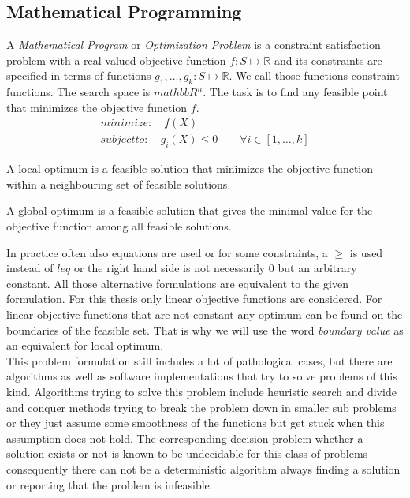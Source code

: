 \subsection{Mathematical Programming}
A \emph{Mathematical Program} or \emph{Optimization Problem} is a constraint satisfaction problem with a real valued objective function $f:S\mapsto \mathbb{R}$ and its constraints are specified in terms of functions $g_1,\dots,g_k:S\mapsto\mathbb{R}$. We call those functions constraint functions. The search space is $mathbb{R}^n$. The task is to find any feasible point that minimizes the objective function $f$.
\begin{eqnarray}
minimize: \quad f(X)\\
subject to: \quad g_i(X)\leq 0 \qquad \forall i\in\left[1,\dots ,k\right] 
\end{eqnarray}
\begin{definition}
A local optimum is a feasible solution that minimizes the objective function within a neighbouring set of feasible solutions.
\end{definition}
\begin{definition}
A global optimum is a feasible solution that gives the minimal value for the objective function among all feasible solutions.
\end{definition}
In practice often also equations are used or for some constraints, a $\geq$ is used instead of $leq$ or the right hand side is not necessarily $0$ but an arbitrary constant. All those alternative formulations are equivalent to the given formulation.
For this thesis only linear objective functions are considered. For linear objective functions that are not constant any optimum can be found on the boundaries of the feasible set. That is why we will use the word \emph{boundary value} as an equivalent for local optimum.\\
This problem formulation still includes a lot of pathological cases, but there are algorithms as well as software implementations that try to solve problems of this kind. Algorithms trying to solve this problem include heuristic search and divide and conquer methods trying to break the problem down in smaller sub problems or they just assume some smoothness of the functions but get stuck when this assumption does not hold. The corresponding decision problem whether a solution exists or not is known to be undecidable for this class of problems consequently there can not be a deterministic algorithm always finding a solution or reporting that the problem is infeasible.


